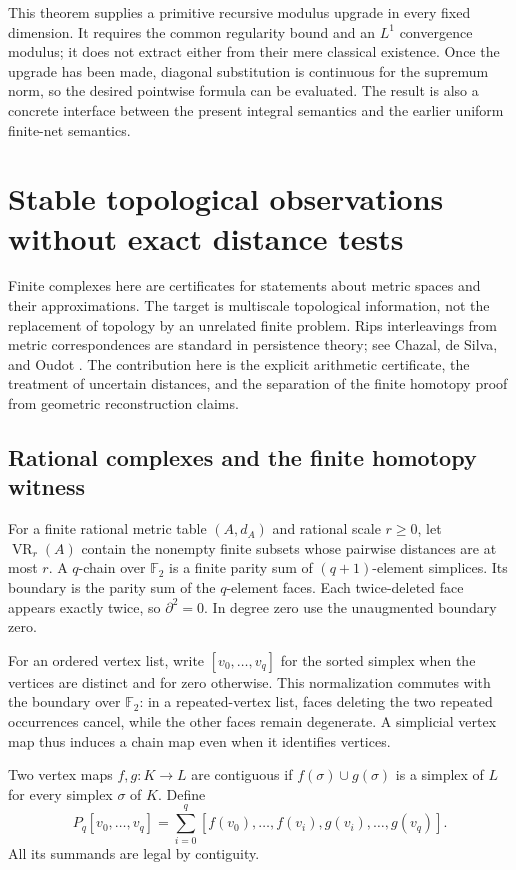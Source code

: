 This theorem supplies a primitive recursive modulus upgrade in every fixed
dimension. It requires the common regularity bound and an $L^1$ convergence
modulus; it does not extract either from their mere classical existence.
Once the upgrade has been made, diagonal substitution is continuous for
the supremum norm, so the desired pointwise formula can be evaluated. The
result is also a concrete interface between the present integral semantics
and the earlier uniform finite-net semantics.

\section{Stable topological observations without exact distance tests}
\label{ct:topology}

Finite complexes here are certificates for statements about metric spaces
and their approximations. The target is multiscale topological information,
not the replacement of topology by an unrelated finite problem.
Rips interleavings from metric correspondences are standard in persistence
theory; see Chazal, de Silva, and Oudot \cite{ct-rips}. The contribution here
is the explicit arithmetic certificate, the treatment of uncertain
distances, and the separation of the finite homotopy proof from geometric
reconstruction claims.

\subsection{Rational complexes and the finite homotopy witness}

For a finite rational metric table $(A,d_A)$ and rational scale $r\geq0$,
let $\operatorname{VR}_r(A)$ contain the nonempty finite subsets whose
pairwise distances are at most $r$. A $q$-chain over $\mathbb F_2$ is a
finite parity sum of $(q+1)$-element simplices. Its boundary is the parity
sum of the $q$-element faces. Each twice-deleted face appears exactly twice,
so $\partial^2=0$. In degree zero use the unaugmented boundary zero.

For an ordered vertex list, write $[v_0,\ldots,v_q]$ for the sorted simplex
when the vertices are distinct and for zero otherwise. This normalization
commutes with the boundary over $\mathbb F_2$: in a repeated-vertex list,
faces deleting the two repeated occurrences cancel, while the other faces
remain degenerate. A simplicial vertex map thus induces a chain map even
when it identifies vertices.

Two vertex maps $f,g:K\to L$ are contiguous if
$f(\sigma)\cup g(\sigma)$ is a simplex of $L$ for every simplex $\sigma$
of $K$. Define
\[
 P_q[v_0,\ldots,v_q]
   =\sum_{i=0}^{q}[f(v_0),\ldots,f(v_i),g(v_i),\ldots,g(v_q)].
\]
All its summands are legal by contiguity.

